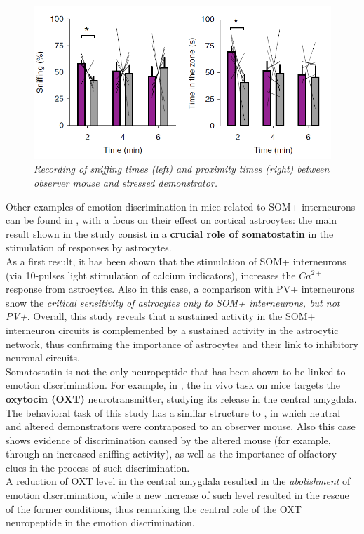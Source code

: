 \documentclass[12pt, a4paper]{report}
\begin{document}
	\begin{figure}
	\begin{center}
		\includegraphics[scale=0.68]{scheggia.png} 
	\end{center} 
	\caption{\textit{Recording of sniffing times (left) and proximity times (right) between observer mouse and stressed demonstrator.}} \label{Scheggia}
	
\end{figure}


Other examples of emotion discrimination in mice related to SOM+ interneurons can be found in \cite{9}, %
 with a focus on their effect on cortical astrocytes: the main result shown in the study consist in a \textbf{crucial role of somatostatin} in the stimulation of responses by astrocytes.\\
As a first result, it has been shown that the stimulation of SOM+ interneurons (via 10-pulses light stimulation of calcium indicators), increases the $Ca^{2+}$ response from astrocytes. Also in this case, a comparison with PV+ interneurons show the \textit{critical sensitivity of astrocytes only to SOM+ interneurons, but not PV+}. Overall, this study reveals that a sustained activity in the SOM+ interneuron circuits is complemented by
a sustained activity in the astrocytic network, thus confirming the importance of astrocytes and their link to inhibitory neuronal circuits. 
\\

Somatostatin is not the only neuropeptide that has been shown to be linked to emotion discrimination. For example, in \cite{10}, %
the in vivo task on mice targets the \textbf{oxytocin (OXT)} neurotransmitter, studying its release in the central amygdala. The behavioral task of this study has a similar structure to \cite{8}, in which neutral and altered demonstrators were contraposed to an observer mouse. Also this case shows evidence of  discrimination caused by the altered mouse (for example, through an increased sniffing activity), as well as the importance of olfactory clues in the process of such discrimination.\\
A reduction of  OXT level in the central amygdala resulted in the \textit{abolishment} of emotion discrimination, while a new increase of such level resulted in the rescue of the former conditions, thus remarking the central role of the OXT neuropeptide in the emotion discrimination.
\\
\end{document}
